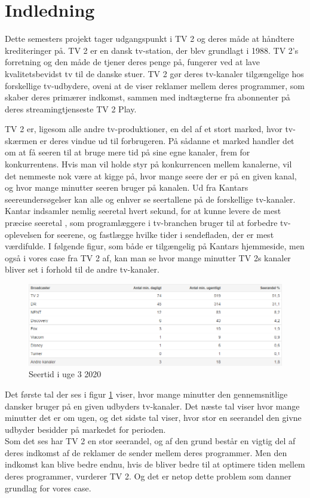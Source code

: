 \clearpage
\section{Indledning}
Dette semesters projekt tager udgangspunkt i TV 2 og deres måde at håndtere krediteringer på. TV 2 er en dansk tv-station, der blev grundlagt i 1988. TV 2's forretning og den måde de tjener deres penge på, fungerer ved at lave kvalitetsbevidst tv til de danske stuer. TV 2 gør deres tv-kanaler tilgængelige hos forskellige tv-udbydere, oveni at de viser reklamer mellem deres programmer, som skaber deres primærer indkomst, sammen med indtægterne fra abonnenter på deres streamingtjenseste TV 2 Play.

TV 2 er, ligesom alle andre tv-produktioner, en del af et stort marked, hvor tv-skærmen er deres vindue ud til forbrugeren. På sådanne et marked handler det om at få seeren til at bruge mere tid på sine egne kanaler, frem for konkurrentens. Hvis man vil holde styr på konkurrencen mellem kanalerne, vil det nemmeste nok være at kigge på, hvor mange seere der er på en given kanal, og hvor mange minutter seeren bruger på kanalen. Ud fra Kantars seereundersøgelser kan alle og enhver se seertallene på de forskellige tv-kanaler. Kantar indsamler nemlig seeretal hvert sekund, for at kunne levere de mest præcise seeretal \cite{url_kantar}, som programlæggere i tv-branchen bruger til at forbedre tv-oplevelsen for seerene, og fastlægge hvilke tider i sendefladen, der er mest værdifulde. I følgende figur, som både er tilgængelig på Kantars hjemmeside, men også i vores case fra TV 2 af, kan man se hvor mange minutter TV 2s kanaler bliver set i forhold til de andre tv-kanaler.
\begin{figure}[H]
    \centering
    \includegraphics[width=1\textwidth]{images/Seertal.png}
    \caption{Seertid i uge 3 2020}
    \label{fig:Seertid}
\end{figure}
Det første tal der ses i figur \ref{fig:Seertid} viser, hvor mange minutter den gennemsnitlige dansker bruger på en given udbyders tv-kanaler. Det næste tal viser hvor mange minutter det er om ugen, og det sidste tal viser, hvor stor en seerandel den givne udbyder besidder på markedet for perioden. \\
Som det ses har TV 2 en stor seerandel, og af den grund består en vigtig del af deres indkomst af de reklamer de sender mellem deres programmer.  Men den indkomst kan blive bedre endnu, hvis de bliver bedre til at optimere tiden mellem deres programmer, vurderer TV 2. Og det er netop dette problem som danner grundlag for vores case.


